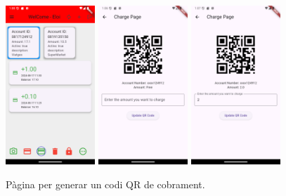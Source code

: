 \documentclass[a4paper,12pt,twoside]{ThesisStyle}
\begin{document}
\begin{figure}[h]
    \centering
    \includegraphics[width=0.3\textwidth]{imatges/mainPage3.png}
    \includegraphics[width=0.3\textwidth]{imatges/chargePage.png}
    \includegraphics[width=0.3\textwidth]{imatges/chargePageWithValue.png}
    \caption{Pàgina per generar un codi QR de cobrament.}
    \label{fig: Pàgina per generar codi QR de cobrament}
\end{figure}
\end{document}
